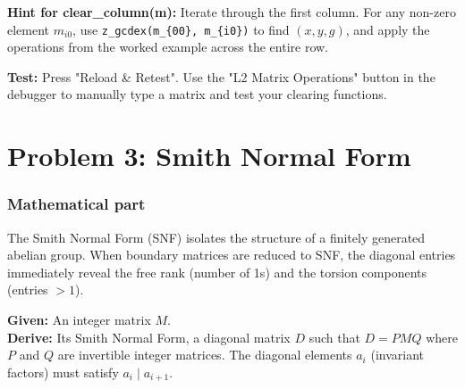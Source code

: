 \documentclass[11pt]{article}
\begin{document}
\textbf{Hint for clear\_column(m):} Iterate through the first column. For any non-zero element $m_{i0}$, use \lstinline|z_gcdex(m_{00}, m_{i0})| to find $(x, y, g)$, and apply the operations from the worked example across the entire row.

\textbf{Test:} Press "Reload \& Retest". Use the "L2 Matrix Operations" button in the debugger to manually type a matrix and test your clearing functions.









\section*{Problem 3: Smith Normal Form}

\subsubsection*{Mathematical part}
The Smith Normal Form (SNF) isolates the structure of a finitely generated abelian group. When boundary matrices are reduced to SNF, the diagonal entries immediately reveal the free rank (number of 1s) and the torsion components (entries $> 1$).

\textbf{Given:} An integer matrix $M$. \\
\textbf{Derive:} Its Smith Normal Form, a diagonal matrix $D$ such that $D = P M Q$ where $P$ and $Q$ are invertible integer matrices. The diagonal elements $a_i$ (invariant factors) must satisfy $a_i \mid a_{i+1}$.
\end{document}
